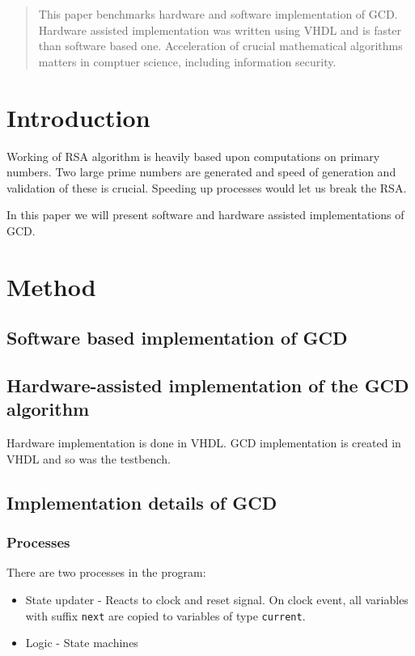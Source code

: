 \documentclass{article}
\begin{document}
\begin{abstract}
This paper benchmarks hardware and software implementation of GCD. Hardware assisted implementation was written using VHDL and is faster than software based one. Acceleration of crucial mathematical algorithms matters in comptuer science, including information security.
\end{abstract}

\section{Introduction}

Working of RSA algorithm is heavily based upon computations on primary numbers. Two large prime numbers are generated and speed of generation and validation of these is crucial. Speeding up processes would let us break the RSA.

In this paper we will present software and hardware assisted implementations of GCD.

\section{Method}

\subsection{Software based implementation of GCD}

\subsection{Hardware-assisted implementation of the GCD algorithm}

Hardware implementation is done in VHDL. GCD implementation is created in VHDL and so was the testbench.

\subsection{Implementation details of GCD}

\subsubsection{Processes}

There are two processes in the program:

\begin{itemize}
\item State updater - Reacts to clock and reset signal. On clock event, all variables with suffix \texttt{next} are copied to variables of type \texttt{current}.
\item Logic - State machines
\end{itemize}
\end{document}
